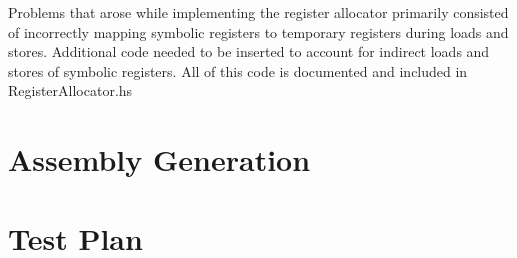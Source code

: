\documentclass[11pt]{article}
\begin{document}
Problems that arose while implementing the register allocator
primarily consisted of incorrectly mapping symbolic registers to
temporary registers during loads and stores. Additional code needed to
be inserted to account for indirect loads and stores of symbolic
registers. All of this code is documented and included in RegisterAllocator.hs

\section {Assembly Generation}  
\label{sec:assembly}

\section {Test Plan}
\end{document}
